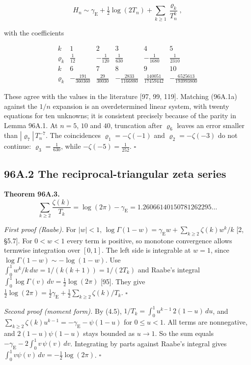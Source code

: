 \documentclass[
  11pt,
]{book}
\renewenvironment{quote}
  {\begin{tcolorbox}[
      enhanced,
      breakable,
      colback=tncream,
      colframe=tnrust,
      boxrule=0.8pt,
      arc=1.5pt,
      left=7pt,
      right=7pt,
      top=6pt,
      bottom=6pt]}
  {\end{tcolorbox}}
\begin{document}
\[
H_n\sim\gamma_{\mathrm E}+\tfrac12\log(2T_n)+\sum_{k\ge1}\frac{\varrho_k}{T_n^{k}},
\tag{96A.1a}
\]

with the coefficients

\[
\begin{array}{c|ccccc}
k & 1 & 2 & 3 & 4 & 5\\ \hline
\varrho_k & \frac1{12} & -\frac1{120} & \frac1{630} & -\frac1{1680} & \frac1{2310}\\[6pt]
k & 6 & 7 & 8 & 9 & 10\\ \hline
\varrho_k & -\frac{191}{360360} & \frac{29}{30030} & -\frac{2833}{1166880}
 & \frac{140051}{17459442} & -\frac{6525613}{193993800}
\end{array}
\]

These agree with the values in the literature {[}97, 99, 119{]}.
Matching (96A.1a) against the \(1/n\) expansion is an overdetermined
linear system, with twenty equations for ten unknowns; it is consistent
precisely because of the parity in Lemma 96A.1. At \(n=5\), \(10\) and
\(40\), truncation after \(\varrho_6\) leaves an error smaller than
\(|\varrho_7|\,T_n^{-7}\). The coincidences \(\varrho_1=-\zeta(-1)\) and
\(\varrho_2=-\zeta(-3)\) do not continue: \(\varrho_3=\tfrac1{630}\),
while \(-\zeta(-5)=\tfrac1{252}\). \(\square\)

\subsection{96A.2 The reciprocal-triangular zeta
series}\label{a.2-the-reciprocal-triangular-zeta-series}

\begin{quote}
\textbf{Theorem 96A.3.} \[
\sum_{k\ge2}\frac{\zeta(k)}{T_k}=\log(2\pi)-\gamma_{\mathrm E}
=1.26066140150781262295\ldots
\tag{96A.2}
\]
\end{quote}

\emph{First proof (Raabe).} For \(|w|<1\),
\(\log\Gamma(1-w)=\gamma_{\mathrm E}w+\sum_{k\ge2}\zeta(k)w^k/k\) {[}2,
§5.7{]}. For \(0<w<1\) every term is positive, so monotone convergence
allows termwise integration over \([0,1]\). The left side is integrable
at \(w=1\), since \(\log\Gamma(1-w)\sim-\log(1-w)\). Use
\(\int_0^1w^k/k\,dw=1/(k(k+1))=1/(2T_k)\) and Raabe's integral
\(\int_0^1\log\Gamma(v)\,dv=\tfrac12\log(2\pi)\) {[}95{]}. They give
\(\tfrac12\log(2\pi)=\tfrac12\gamma_{\mathrm E}+\tfrac12\sum_{k\ge2}\zeta(k)/T_k\).
\(\square\)

\emph{Second proof (moment form).} By (4.5),
\(1/T_k=\int_0^1u^{k-1}\,2(1-u)\,du\), and
\(\sum_{k\ge2}\zeta(k)u^{k-1}=-\gamma_{\mathrm E}-\psi(1-u)\) for
\(0\le u<1\). All terms are nonnegative, and \(2(1-u)\psi(1-u)\) stays
bounded as \(u\to1\). So the sum equals
\(-\gamma_{\mathrm E}-2\int_0^1v\,\psi(v)\,dv\). Integrating by parts
against Raabe's integral gives
\(\int_0^1v\psi(v)\,dv=-\tfrac12\log(2\pi)\). \(\square\)
\end{document}
